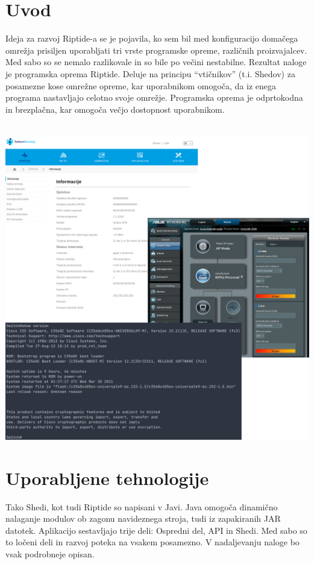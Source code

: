 \documentclass[12pt]{article}
\begin{document}
\tableofcontents
\newpage

\section{Uvod}
Ideja za razvoj Riptide-a se je pojavila, ko sem bil med konfiguracijo
domačega omrežja prisiljen uporabljati tri vrste programske opreme,
različnih proizvajalcev. Med sabo so se nemalo razlikovale in so bile
po večini nestabilne. Rezultat naloge je programska oprema Riptide.
Deluje na principu “vtičnikov” (t.i. Shedov) za posamezne kose omrežne
opreme, kar uporabnikom omogoča, da iz enega programa nastavljajo celotno
svoje omrežje. Programska oprema je odprtokodna in brezplačna, kar omogoča
večjo dostopnost uporabnikom.
\\\\

\begin{center}
	\includegraphics[scale=0.24]{slike/config.png}
\end{center}
\newpage

\section{Uporabljene tehnologije}
Tako Shedi, kot tudi Riptide so napisani v Javi. Java omogoča dinamično
nalaganje modulov ob zagonu navideznega stroja, tudi iz zapakiranih JAR
datotek. Aplikacijo sestavljajo trije deli: Ospredni del, API in Shedi. Med
sabo so to ločeni deli in razvoj poteka na vsakem posamezno. V nadaljevanju
naloge bo vsak podrobneje opisan.
\end{document}
